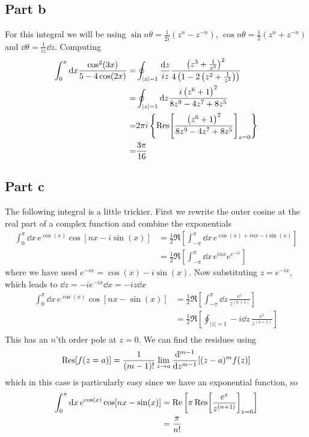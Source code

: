 \documentclass[a4paper,12pt]{article}
\begin{document}
\subsection*{Part b}
For this integral we will be using $\sin n\theta =\frac{1}{2i}\left(z^n-z^{-n}\right)$, $\cos n\theta =\frac{1}{2}\left(z^n+z^{-n}\right)$ and $\dd \theta=\frac{1}{iz}\dd z$. Computing
\begin{equation}
	\begin{aligned}
		\int_{0}^{\pi}\dd x\frac{\cos^2(3x)}{5-4\cos(2x)}
		=&\oint_{|z|=1}\frac{\dd z}{iz}\frac{\left(z^3+\frac{1}{z^3}\right)^2}{4 \left(1-2 \left(z^2+\frac{1}{z^2}\right)\right)}\\
		=&\oint_{|z|=1}\dd z \frac{i \left(z^6+1\right)^2}{8 z^9-4 z^7+8 z^5}\\
			=&2\pi i \left\{
			\Res[\frac{\left(z^6+1\right)^2}{8 z^9-4 z^7+8 z^5}]_{z=0}
			\right\}\\
			=&\frac{3\pi}{16}
	\end{aligned}
\end{equation}
\subsection*{Part c}
The following integral is a little trickier. First we rewrite the outer cosine at the real part of a complex function and combine the exponentials
\begin{equation}
\begin{aligned}
\int_{0}^{\pi}\dd x\, e^{\cos(x)}\cos[nx-i\sin(x)]&=\frac{1}{2}\Re\left[\int_{-\pi}^{\pi}\dd x\, e^{\cos(x)+inx-i\sin(x)}\right]\\
&=\frac{1}{2}\Re\left[\int_{-\pi}^{\pi}\dd x\, e^{inx}e^{e^{-ix}}\right]
\end{aligned}
\end{equation}
where we have used $e^{-ix}=\cos(x)-i\sin(x)$. Now
substituting $z=e^{-ix}$, which leads to $\dd z=-i e^{-ix} \dd x=-iz \dd x$
\begin{equation}
	\begin{aligned}
\int_{0}^{\pi}\dd x\, e^{\cos(x)}\cos[nx-\sin(x)]&=\frac{1}{2}\Re\left[\int_{-\pi}^{\pi}\dd z\, \frac{e^{z}}{z^{(n+1)}}\right]\\
&=\frac{1}{2}\Re\left[\oint_{|z|=1}-i\dd z\, \frac{e^{z}}{z^{(n+1)}}\right]\\
	\end{aligned}
\end{equation}
This has an $n$'th order pole at $z=0$. We can find the residues using
\begin{equation}
	\Res[f(z=a)]=\frac{1}{(m-1)!}\lim_{z\to a}\dv[m-1]{}{z}[(z-a)^mf(z)]
\end{equation}
which in this case is particularly easy since we have an exponential function, so
\begin{equation}
	\begin{aligned}
		\int_{0}^{\pi}\dd x\, e^{\cos(x)}\cos[nx-\sin(x)]&=
		\Re\left [\pi \Res[\frac{e^{z}}{z^{(n+1)}}]_{z=0}\right]\\
		&=\frac{\pi}{n!}
	\end{aligned}
\end{equation}
\end{document}
